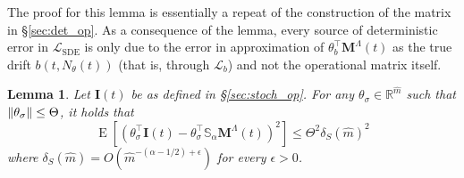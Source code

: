 \documentclass[11pt, a4paper]{article}
\theoremstyle{theoremstyle}
\newtheorem{lemma}[theorem]{Lemma}
\theoremstyle{definitionstyle}
\DeclareMathOperator{\EE}{\mathrm E}
\DeclarePairedDelimiter{\norm}{\lVert}{\rVert}
\begin{document}
The proof for this lemma is essentially a repeat of the construction of the matrix in \S\ref{sec:det_op}. As a consequence of the lemma, every source of deterministic error in \( \mathcal L_{\text{SDE}} \) is only due to the error in approximation of \( \theta_b^\top \mathbf M^\Lambda(t) \) as the true drift \( b(t, N_\theta(t)) \) (that is, through \( \mathcal L_b \)) and not the operational matrix itself.

\begin{lemma}\label{lem:3.2}
    Let \( \mathbf I(t) \) be as defined in \S\ref{sec:stoch_op}. For any \( \theta_\sigma \in \mathbb R^{\hat m} \) such that \( \norm{\theta_\sigma} \leq \Theta \), it holds that
    \begin{equation}
        \EE \left [ (\theta_\sigma^\top \mathbf I(t) - \theta_\sigma^\top \mathbb S_\alpha \mathbf M^\Lambda(t))^2 \right ] \leq \Theta^2 \delta_S(\hat m)^2
    \end{equation}
    where \( \delta_S(\hat m) = O(\hat m^{-(\alpha - 1/2) + \epsilon}) \) for every \( \epsilon > 0 \).
\end{lemma}
\end{document}
